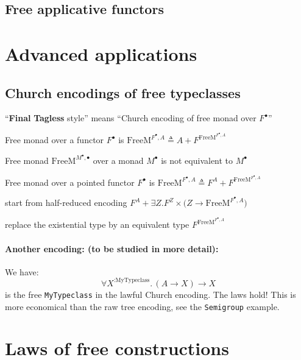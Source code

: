 \subsection{Free applicative functors}

\section{Advanced applications}

\subsection{Church encodings of free typeclasses}

\textsf{``}\textbf{Final} \textbf{Tagless} style\textsf{''} means \textsf{``}Church encoding
of free monad over $F^{\bullet}$\textsf{''}

Free monad over a functor $F^{\bullet}$ is $\text{FreeM}^{F^{\bullet},A}\triangleq A+F^{\text{FreeM}^{F^{\bullet},A}}$

Free monad $\text{FreeM}^{M^{\bullet},\bullet}$ over a monad $M^{\bullet}$
is not equivalent to $M^{\bullet}$

Free monad over a pointed functor $F^{\bullet}$ is {\footnotesize{}$\text{FreeM}^{F^{\bullet},A}\triangleq F^{A}+F^{\text{FreeM}^{F^{\bullet},A}}$}{\footnotesize\par}

start from half-reduced encoding $F^{A}+\exists Z.F^{Z}\times\big(Z\rightarrow\text{FreeM}^{F^{\bullet},A}\big)$ 

replace the existential type by an equivalent type $F^{\text{FreeM}^{F^{\bullet},A}}$

\paragraph{Another encoding: (to be studied in more detail):}

We have:
\[
\forall X^{:\text{MyTypeclass}}.\,(A\rightarrow X)\rightarrow X
\]
is the free \lstinline!MyTypeclass!
in the lawful Church encoding. The laws hold! This is more economical
than the raw tree encoding, see the \lstinline!Semigroup!
example.

\section{Laws of free constructions}

